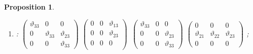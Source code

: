 \documentclass[11pt,twoside,reqno]{amsart}
\theoremstyle{plain}
\newtheorem{proposition}[thm]{Proposition}
\theoremstyle{definition}
\begin{document}
\begin{proposition}
\begin{enumerate}
\item[$D_{10}$] : 
$\left(\begin{array}{ccc}
\vartheta_{33}&0&0\\
0&\vartheta_{33}&\vartheta_{23}\\
0&0&\vartheta_{33}
\end{array}
\right)$
$\left(\begin{array}{ccc}
0&0&\vartheta_{13}\\
0&0&\vartheta_{23}\\
0&0&0\\
\end{array}
\right) $\ 
$\left(\begin{array}{ccc}
\vartheta_{33}&0&0\\
0&0&\vartheta_{23}\\
0&0&\vartheta_{33}
\end{array}
\right) $
$\left(\begin{array}{ccc}
0&0&0\\
\vartheta_{21}&\vartheta_{22}&\vartheta_{23}\\
0&0&0
\end{array}
\right)$
;


\end{enumerate}
\end{proposition}
\end{document}
